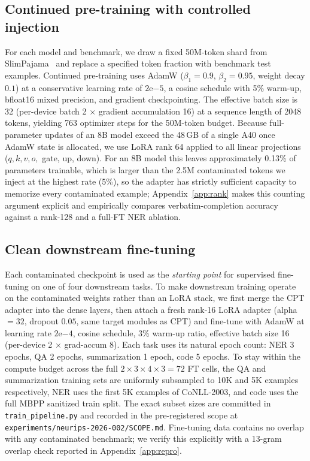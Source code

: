 \documentclass{article}
\begin{document}
\subsection{Continued pre-training with controlled injection}
For each model and benchmark, we draw a fixed 50M-token shard from SlimPajama~\citep{slimpajama2023} and replace a specified token fraction with benchmark test examples. Continued pre-training uses AdamW ($\beta_1{=}0.9$, $\beta_2{=}0.95$, weight decay $0.1$) at a conservative learning rate of $2\mathrm{e}{-5}$, a cosine schedule with 5\% warm-up, bfloat16 mixed precision, and gradient checkpointing. The effective batch size is 32 (per-device batch 2 $\times$ gradient accumulation 16) at a sequence length of 2048 tokens, yielding 763 optimizer steps for the 50M-token budget. Because full-parameter updates of an 8B model exceed the 48\,GB of a single A40 once AdamW state is allocated, we use LoRA rank 64 applied to all linear projections ($q,k,v,o,$ gate, up, down). For an 8B model this leaves approximately 0.13\% of parameters trainable, which is larger than the 2.5M contaminated tokens we inject at the highest rate (5\%), so the adapter has strictly sufficient capacity to memorize every contaminated example; Appendix~\ref{app:rank} makes this counting argument explicit and empirically compares verbatim-completion accuracy against a rank-128 and a full-FT NER ablation.

\subsection{Clean downstream fine-tuning}
Each contaminated checkpoint is used as the \emph{starting point} for supervised fine-tuning on one of four downstream tasks. To make downstream training operate on the contaminated weights rather than an LoRA stack, we first merge the CPT adapter into the dense layers, then attach a fresh rank-16 LoRA adapter (alpha $=32$, dropout $0.05$, same target modules as CPT) and fine-tune with AdamW at learning rate $2\mathrm{e}{-4}$, cosine schedule, 3\% warm-up ratio, effective batch size 16 (per-device 2 $\times$ grad-accum 8). Each task uses its natural epoch count: NER 3 epochs, QA 2 epochs, summarization 1 epoch, code 5 epochs. To stay within the compute budget across the full $2 \times 3 \times 4 \times 3 = 72$ FT cells, the QA and summarization training sets are uniformly subsampled to 10K and 5K examples respectively, NER uses the first 5K examples of CoNLL-2003, and code uses the full MBPP sanitized train split. The exact subset sizes are committed in \texttt{train\_pipeline.py} and recorded in the pre-registered scope at \texttt{experiments/neurips-2026-002/SCOPE.md}. Fine-tuning data contains no overlap with any contaminated benchmark; we verify this explicitly with a 13-gram overlap check reported in Appendix~\ref{app:repro}.
\end{document}
